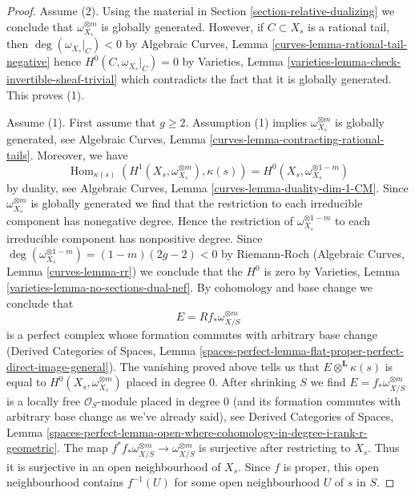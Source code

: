 \documentclass{stacks-project}
\theoremstyle{plain}
\theoremstyle{definition}
\theoremstyle{remark}
\numberwithin{equation}{subsection}
\def\Hom{\mathop{\mathrm{Hom}}\nolimits}
\begin{document}
\begin{proof}
Assume (2). Using the material in Section \ref{section-relative-dualizing}
we conclude that $\omega_{X_s}^{\otimes m}$ is
globally generated. However, if $C \subset X_s$
is a rational tail, then $\deg(\omega_{X_s}|_C) < 0$ by
Algebraic Curves, Lemma \ref{curves-lemma-rational-tail-negative}
hence $H^0(C, \omega_{X_s}|_C) = 0$ by
Varieties, Lemma \ref{varieties-lemma-check-invertible-sheaf-trivial}
which contradicts the fact that it is globally generated.
This proves (1).

\medskip\noindent
Assume (1). First assume that $g \geq 2$. Assumption (1) 
implies $\omega_{X_s}^{\otimes m}$ is globally generated,
see Algebraic Curves, Lemma \ref{curves-lemma-contracting-rational-tails}.
Moreover, we have
$$
\Hom_{\kappa(s)}(H^1(X_s, \omega_{X_s}^{\otimes m}), \kappa(s)) =
H^0(X_s, \omega_{X_s}^{\otimes 1 - m})
$$
by duality, see Algebraic Curves, Lemma \ref{curves-lemma-duality-dim-1-CM}.
Since $\omega_{X_s}^{\otimes m}$ is globally generated we find
that the restriction to each irreducible component has nonegative degree.
Hence the restriction of $\omega_{X_s}^{\otimes 1 - m}$ to each
irreducible component has nonpositive degree. Since
$\deg(\omega_{X_s}^{\otimes 1 - m}) = (1 - m)(2g - 2) < 0$ by Riemann-Roch
(Algebraic Curves, Lemma \ref{curves-lemma-rr}) we conclude that the $H^0$
is zero by Varieties, Lemma \ref{varieties-lemma-no-sections-dual-nef}.
By cohomology and base change we conclude that
$$
E = Rf_*\omega_{X/S}^{\otimes m}
$$
is a perfect complex whose formation commutes with arbitrary base change
(Derived Categories of Spaces, Lemma
\ref{spaces-perfect-lemma-flat-proper-perfect-direct-image-general}).
The vanishing proved above tells us that $E \otimes^\mathbf{L} \kappa(s)$
is equal to $H^0(X_s, \omega_{X_s}^{\otimes m})$ placed in degree $0$.
After shrinking $S$ we find $E = f_*\omega_{X/S}^{\otimes m}$
is a locally free $\mathcal{O}_S$-module placed in degree $0$
(and its formation commutes with arbitrary base change as
we've already said), see Derived Categories of Spaces, Lemma
\ref{spaces-perfect-lemma-open-where-cohomology-in-degree-i-rank-r-geometric}.
The map $f^*f_*\omega_{X/S}^{\otimes m} \to \omega_{X/S}^{\otimes m}$
is surjective after restricting to $X_s$. Thus it is surjective in
an open neighbourhood of $X_s$. Since $f$ is proper, this open
neighbourhood contains $f^{-1}(U)$ for some open neighbourhood
$U$ of $s$ in $S$.


\end{proof}
\end{document}
